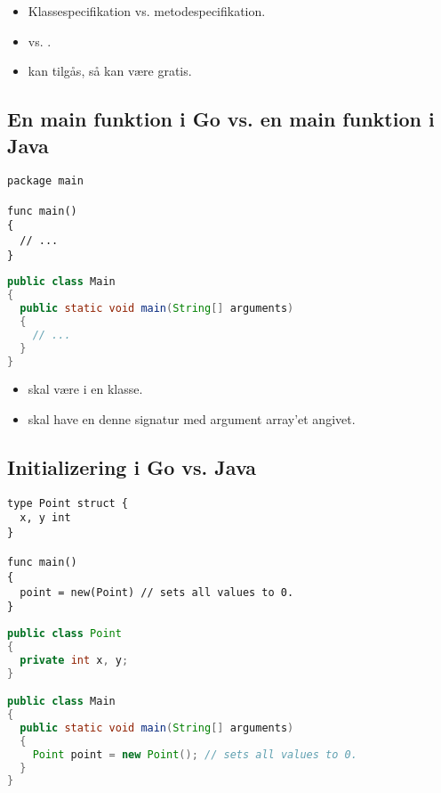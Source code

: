 \begin{itemize}

\item Klassespecifikation vs. metodespecifikation.

\item {} vs. . 

\item {} kan tilgås, så  kan være gratis.

\end{itemize}

\newpage

\subsection{En main funktion i Go vs. en main funktion i Java}

\begin{lstlisting}
package main

func main()
{
  // ...
}
\end{lstlisting}

\begin{lstlisting}[language=Java]
public class Main
{
  public static void main(String[] arguments)
  {
    // ...
  }
}
\end{lstlisting}

\begin{itemize}

\item {} skal være i en klasse.

\item {} skal have en denne signatur med argument array'et angivet.

\end{itemize}

\newpage

\subsection{Initializering i Go vs. Java}

\begin{lstlisting}
type Point struct {
  x, y int
}

func main()
{
  point = new(Point) // sets all values to 0.
}
\end{lstlisting}

\begin{lstlisting}[language=Java]
public class Point
{
  private int x, y;
}

public class Main
{
  public static void main(String[] arguments)
  {
    Point point = new Point(); // sets all values to 0.
  }
}
\end{lstlisting}

